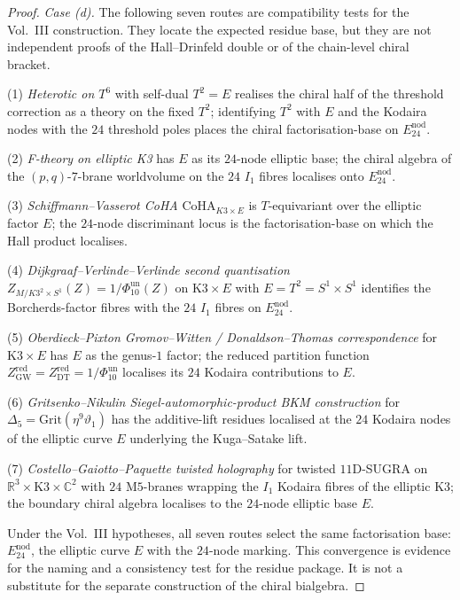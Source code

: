 \begin{proof}
\emph{Case \textup{(d)}.} The following seven routes are compatibility
tests for the Vol.~III construction. They locate the expected residue
base, but they are not independent proofs of the Hall--Drinfeld double
or of the chain-level chiral bracket.

(1) \emph{Heterotic on $T^6$} with self-dual $T^2 = E$
\cite{HarveyMoore1996} realises the chiral half of the threshold
correction as a theory on the fixed $T^2$; identifying $T^2$ with $E$
and the Kodaira nodes with the $24$ threshold poles places the chiral
factorisation-base on $E^{\mathrm{nod}}_{24}$.

(2) \emph{F-theory on elliptic K3} has $E$ as its $24$-node elliptic
base; the chiral algebra of the $(p,q)$-$7$-brane worldvolume on the
$24$ $I_1$ fibres localises onto $E^{\mathrm{nod}}_{24}$.

(3) \emph{Schiffmann--Vasserot CoHA} $\mathrm{CoHA}_{K3\times E}$ is
$T$-equivariant over the elliptic factor $E$; the $24$-node discriminant
locus is the factorisation-base on which the Hall product localises.

(4) \emph{Dijkgraaf--Verlinde--Verlinde second quantisation}
$Z_{M/K3^2\times S^1}(Z) = 1/\Phi_{10}^{\mathrm{un}}(Z)$ on $\mathrm{K3}\times E$
with $E = T^2 = S^1\times S^1$ identifies the Borcherds-factor fibres
with the $24$ $I_1$ fibres on $E^{\mathrm{nod}}_{24}$.

(5) \emph{Oberdieck--Pixton Gromov--Witten / Donaldson--Thomas
correspondence} \cite{OberdieckPixton2016} for $\mathrm{K3}\times E$
has $E$ as the genus-$1$ factor; the reduced partition function
$Z^{\mathrm{red}}_{\mathrm{GW}} = Z^{\mathrm{red}}_{\mathrm{DT}} =
1/\Phi_{10}^{\mathrm{un}}$ localises its $24$ Kodaira contributions to $E$.

(6) \emph{Gritsenko--Nikulin Siegel-automorphic-product BKM construction}
\cite{GritsenkoNikulin1998} for $\Delta_5 = \mathrm{Grit}(\eta^9\vartheta_1)$
has the additive-lift residues localised at the $24$ Kodaira nodes of the
elliptic curve $E$ underlying the Kuga--Satake lift.

(7) \emph{Costello--Gaiotto--Paquette twisted holography} for twisted
$11$D-SUGRA on $\mathbb{R}^3\times\mathrm{K3}\times\mathbb{C}^2$ with
$24$ M$5$-branes wrapping the $I_1$ Kodaira fibres of the elliptic K3;
the boundary chiral algebra localises to the $24$-node elliptic base $E$.

Under the Vol.~III hypotheses, all seven routes select the same
factorisation base: $E^{\mathrm{nod}}_{24}$, the elliptic curve $E$ with
the $24$-node marking. This convergence is evidence for the naming and
a consistency test for the residue package. It is not a substitute for
the separate construction of the chiral bialgebra.


\end{proof}
